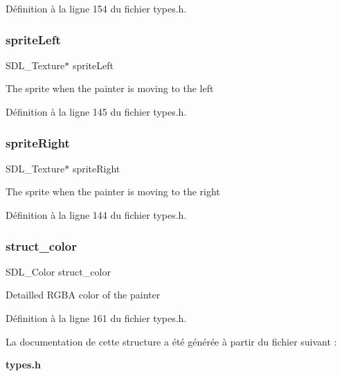 Définition à la ligne 154 du fichier types.\+h.

\mbox{\label{structpainter_a6172789122e545529f4a04419a0835f7}} 
\subsubsection{sprite\+Left}
{\footnotesize\ttfamily S\+D\+L\+\_\+\+Texture$\ast$ sprite\+Left}

The sprite when the painter is moving to the left 

Définition à la ligne 145 du fichier types.\+h.

\mbox{\label{structpainter_a9e331a61bff9303277f1d5666aa85c4d}} 
\subsubsection{sprite\+Right}
{\footnotesize\ttfamily S\+D\+L\+\_\+\+Texture$\ast$ sprite\+Right}

The sprite when the painter is moving to the right 

Définition à la ligne 144 du fichier types.\+h.

\mbox{\label{structpainter_ad40888d04f08a9b49fd8c442327fddef}} 
\subsubsection{struct\+\_\+color}
{\footnotesize\ttfamily S\+D\+L\+\_\+\+Color struct\+\_\+color}

Detailled R\+G\+BA color of the painter 

Définition à la ligne 161 du fichier types.\+h.



La documentation de cette structure a été générée à partir du fichier suivant \+:\begin{DoxyCompactItemize}
\item 
\textbf{ types.\+h}\end{DoxyCompactItemize}
